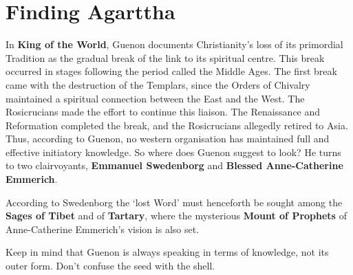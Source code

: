 \section{Finding Agarttha}

In \textbf{King of the World}, Guenon documents Christianity's loss of its primordial Tradition as the gradual break of the link to its spiritual centre. This break occurred in stages following the period called the Middle Ages. The first break came with the destruction of the Templars, since the Orders of Chivalry maintained a spiritual connection between the East and the West. The Rosicrucians made the effort to continue this liaison. The Renaissance and Reformation completed the break, and the Rosicrucians allegedly retired to Asia. Thus, according to Guenon, no western organisation has maintained full and effective initiatory knowledge. So where does Guenon suggest to look? He turns to two clairvoyants, \textbf{Emmanuel Swedenborg} and \textbf{Blessed Anne-Catherine Emmerich}.

\begin{quotex}
According to Swedenborg the `lost Word' must henceforth be sought among the \textbf{Sages of Tibet} and of \textbf{Tartary}, where the mysterious \textbf{Mount of Prophets} of Anne-Catherine Emmerich's vision is also set.
\end{quotex}


Keep in mind that Guenon is always speaking in terms of knowledge, not its outer form. Don't confuse the seed with the shell.



